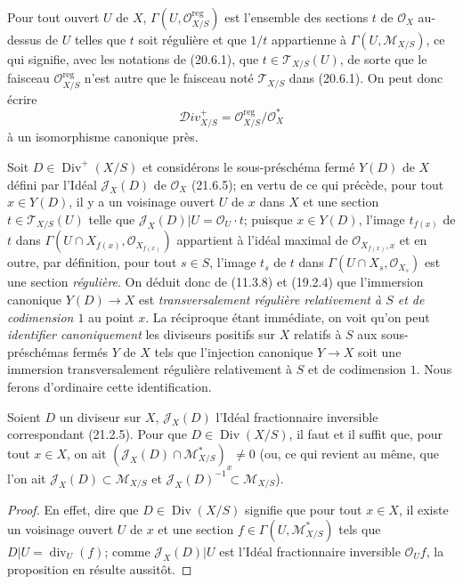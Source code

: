 Pour tout ouvert $U$ de $X$, $\Gamma(U,\mathcal O_{X/S}^{\mathrm{reg}})$ est
l'ensemble des sections $t$ de $\mathcal O_X$ au-dessus de $U$ telles que $t$ soit
régulière et que $1/t$ appartienne à $\Gamma(U,\mathscr M_{X/S})$, ce qui signifie,
avec les notations de (20.6.1), que $t\in\mathscr T_{X/S}(U)$, de sorte que le faisceau
$\mathcal O_{X/S}^{\mathrm{reg}}$ n'est autre que le faisceau noté $\mathscr T_{X/S}$
dans (20.6.1). On peut donc écrire
\[
\label{IV.21.15.3.2}
  \mathscr{D}iv_{X/S}^+=\mathcal O_{X/S}^{\mathrm{reg}}/\mathcal O_X^*
  \tag{21.15.3.2}
\]
à un isomorphisme canonique près.

\begin{env}[21.15.3.3]
\label{IV.21.15.3.3}
Soit $D\in\operatorname{Div}^+(X/S)$ et considérons le sous-préschéma fermé $Y(D)$
de $X$ défini par l'Idéal $\mathscr J_X(D)$ de $\mathcal O_X$ (21.6.5); en vertu de
ce qui précède, pour tout $x\in Y(D)$, il y a un voisinage ouvert $U$ de $x$ dans $X$
et une section $t\in\mathscr T_{X/S}(U)$ telle que
$\mathscr J_X(D)|U=\mathcal O_U\cdot t$; puisque $x\in Y(D)$, l'image $t_{f(x)}$ de
$t$ dans $\Gamma(U\cap X_{f(x)},\mathcal O_{X_{f(x)}})$ appartient à l'idéal maximal
de $\mathcal O_{X_{f(x)},x}$ et en outre, par définition, pour tout $s\in S$, l'image
$t_s$ de $t$ dans $\Gamma(U\cap X_s,\mathcal O_{X_s})$ est une section
\emph{régulière}. On déduit donc de (11.3.8) et (19.2.4) que l'immersion canonique
$Y(D)\to X$ est \emph{transversalement régulière relativement à $S$ et de
codimension $1$} au point $x$. La réciproque étant immédiate, on voit qu'on peut
\emph{identifier canoniquement} les diviseurs positifs sur $X$ relatifs à $S$ aux
sous-préschémas fermés $Y$ de $X$ tels que l'injection canonique $Y\to X$ soit une
immersion transversalement régulière relativement à $S$ et de codimension $1$. Nous
ferons d'ordinaire cette identification.
\end{env}

\begin{proposition}[21.15.4]
\label{IV.21.15.4}
Soient $D$ un diviseur sur $X$, $\mathscr J_X(D)$ l'Idéal fractionnaire inversible
correspondant (21.2.5). Pour que $D\in\operatorname{Div}(X/S)$, il faut et il suffit
que, pour tout $x\in X$, on ait
$(\mathscr J_X(D)\cap\mathscr M_{X/S}^*)_x\ne0$ (ou, ce qui revient au même, que
l'on ait $\mathscr J_X(D)\subset\mathscr M_{X/S}$ et
$\mathscr J_X(D)^{-1}\subset\mathscr M_{X/S}$).
\end{proposition}

\begin{proof}
En effet, dire que $D\in\operatorname{Div}(X/S)$ signifie que pour tout $x\in X$, il
existe un voisinage ouvert $U$ de $x$ et une section
$f\in\Gamma(U,\mathscr M_{X/S}^*)$ tels que $D|U=\operatorname{div}_U(f)$; comme
$\mathscr J_X(D)|U$ est l'Idéal fractionnaire inversible $\mathcal O_Uf$, la
proposition en résulte aussitôt.
\end{proof}

